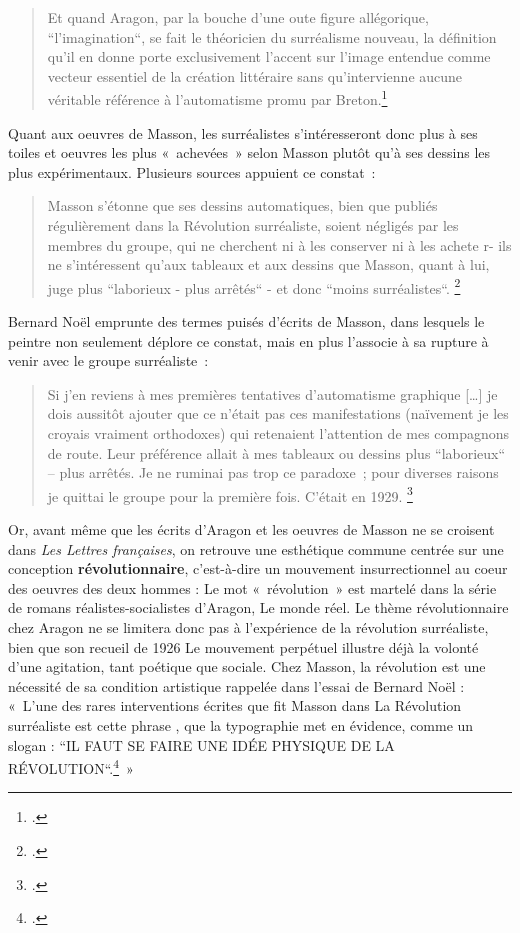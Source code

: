 \begin{quote}
Et quand Aragon, par la bouche d’une oute figure allégorique, “l’imagination“, se fait le théoricien du surréalisme nouveau, la définition qu’il en donne porte exclusivement l’accent sur l’image entendue comme vecteur essentiel de la création littéraire sans qu’intervienne aucune véritable référence à l’automatisme promu par Breton.\footcite[]{biographie}
\end{quote}

Quant aux oeuvres de Masson, les surréalistes s’intéresseront donc plus à ses toiles et oeuvres les plus « achevées » selon Masson plutôt qu'à ses dessins les plus expérimentaux. Plusieurs sources appuient ce constat : 

\begin{quote}
Masson s’étonne que ses dessins automatiques, bien que publiés régulièrement dans la Révolution surréaliste, soient négligés par les membres du groupe, qui ne cherchent ni à les conserver ni à les achete r- ils ne s’intéressent qu’aux tableaux et aux dessins que Masson, quant à lui, juge plus “laborieux - plus arrêtés“ - et donc “moins surréalistes“. \footcite[p.28]{noel}
\end{quote}
Bernard Noël emprunte des termes puisés d’écrits de Masson, dans lesquels le peintre non seulement déplore ce constat, mais en plus l’associe à sa rupture à venir avec le groupe surréaliste : 
\begin{quote}
Si j’en reviens à mes premières tentatives d’automatisme graphique […] je dois aussitôt ajouter que ce n’était pas ces manifestations (naïvement je les croyais vraiment orthodoxes) qui retenaient l’attention de mes compagnons de route. Leur préférence allait à mes tableaux ou dessins  plus “laborieux“ – plus arrêtés. Je ne ruminai pas trop ce paradoxe ; pour diverses raisons je quittai le groupe pour la première fois. C’était en 1929. \footcite[p.35]{anneessurrealistes}
\end{quote}
Or, avant même que les écrits d’Aragon et les oeuvres de Masson ne se croisent dans \emph{Les Lettres françaises}, on retrouve une esthétique commune centrée sur une conception \textbf{révolutionnaire}, c’est-à-dire un mouvement insurrectionnel au coeur des oeuvres des deux hommes : Le mot « révolution » est martelé dans la série de romans réalistes-socialistes d’Aragon, Le monde réel. Le thème révolutionnaire chez Aragon ne se limitera donc pas à l’expérience de la révolution surréaliste, bien que son recueil de 1926 Le mouvement perpétuel illustre déjà la volonté d’une agitation, tant poétique que sociale. Chez Masson, la révolution est une nécessité de sa condition artistique rappelée dans l’essai de Bernard Noël : « L’une des rares interventions écrites que fit Masson dans La Révolution surréaliste est cette phrase , que la typographie met en évidence, comme un slogan : “IL FAUT SE FAIRE UNE IDÉE PHYSIQUE DE LA RÉVOLUTION“.\footcite[p.28]{noel} »

